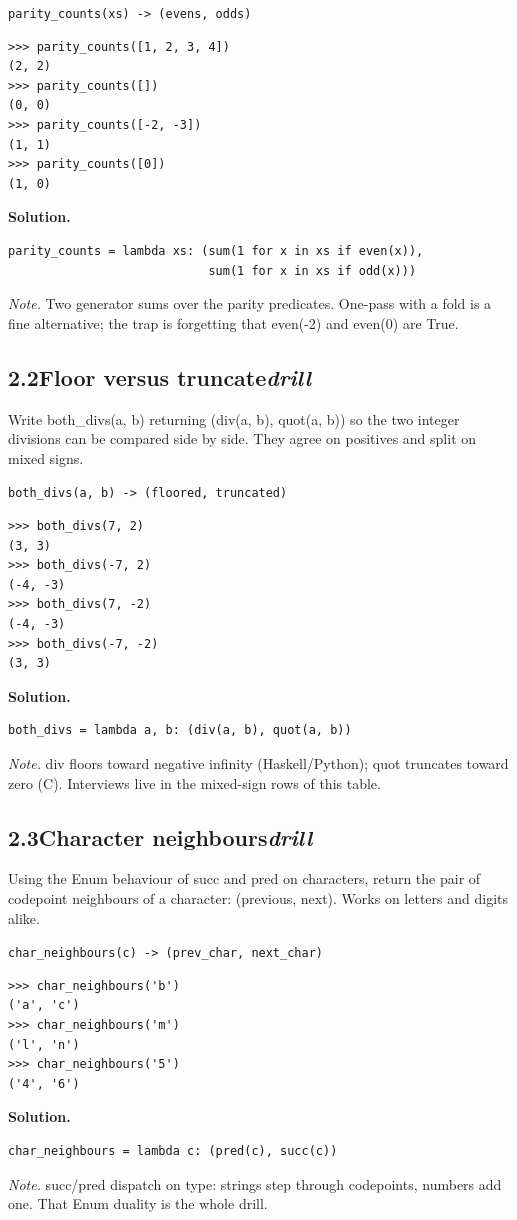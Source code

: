 \documentclass[10pt,letterpaper]{book}
\begin{document}
\noindent\texttt{parity\_counts(xs) -> (evens, odds)}
\begin{lstlisting}[style=ex]
>>> parity_counts([1, 2, 3, 4])
(2, 2)
>>> parity_counts([])
(0, 0)
>>> parity_counts([-2, -3])
(1, 1)
>>> parity_counts([0])
(1, 0)
\end{lstlisting}
\noindent\textbf{Solution.}
\begin{lstlisting}[style=code]
parity_counts = lambda xs: (sum(1 for x in xs if even(x)),
                            sum(1 for x in xs if odd(x)))
\end{lstlisting}
\noindent\textit{Note.} Two generator sums over the parity predicates. One-pass with a fold is a fine alternative; the trap is forgetting that even(-2) and even(0) are True.

\subsection*{2.2\quad Floor versus truncate\hfill\textnormal{\textit{drill}}}
Write both\_divs(a, b) returning (div(a, b), quot(a, b)) so the two integer divisions can be compared side by side. They agree on positives and split on mixed signs.

\noindent\texttt{both\_divs(a, b) -> (floored, truncated)}
\begin{lstlisting}[style=ex]
>>> both_divs(7, 2)
(3, 3)
>>> both_divs(-7, 2)
(-4, -3)
>>> both_divs(7, -2)
(-4, -3)
>>> both_divs(-7, -2)
(3, 3)
\end{lstlisting}
\noindent\textbf{Solution.}
\begin{lstlisting}[style=code]
both_divs = lambda a, b: (div(a, b), quot(a, b))
\end{lstlisting}
\noindent\textit{Note.} div floors toward negative infinity (Haskell/Python); quot truncates toward zero (C). Interviews live in the mixed-sign rows of this table.

\subsection*{2.3\quad Character neighbours\hfill\textnormal{\textit{drill}}}
Using the Enum behaviour of succ and pred on characters, return the pair of codepoint neighbours of a character: (previous, next). Works on letters and digits alike.

\noindent\texttt{char\_neighbours(c) -> (prev\_char, next\_char)}
\begin{lstlisting}[style=ex]
>>> char_neighbours('b')
('a', 'c')
>>> char_neighbours('m')
('l', 'n')
>>> char_neighbours('5')
('4', '6')
\end{lstlisting}
\noindent\textbf{Solution.}
\begin{lstlisting}[style=code]
char_neighbours = lambda c: (pred(c), succ(c))
\end{lstlisting}
\noindent\textit{Note.} succ/pred dispatch on type: strings step through codepoints, numbers add one. That Enum duality is the whole drill.
\end{document}
